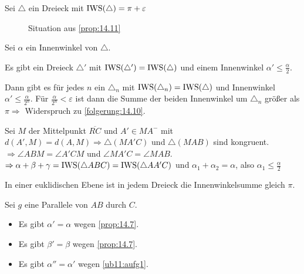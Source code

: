 \begin{beweis}
    Sei $\triangle$ ein Dreieck mit $\operatorname{IWS}(\triangle) = \pi + \varepsilon$

    \begin{figure}[ht]
        \centering
        \label{fig:prop14.11.0}
        \caption{Situation aus \cref{prop:14.11}}
    \end{figure}

    Sei $\alpha$ ein Innenwinkel von $\triangle$.

    \begin{behauptung}
        Es gibt ein Dreieck $\triangle'$ mit 
        $\operatorname{IWS}(\triangle') = \operatorname{IWS}(\triangle)$ und einem Innenwinkel
        $\alpha' \leq \frac{\alpha}{2}$.

        Dann gibt es für jedes $n$ ein $\triangle_n$ mit $\operatorname{IWS}(\triangle_n) = \operatorname{IWS}(\triangle)$
        und Innenwinkel $\alpha' \leq \frac{\alpha}{2^n}$. Für $\frac{\alpha}{2^n} < \varepsilon$
        ist dann die Summe der beiden Innenwinkel
        um $\triangle_n$ größer als $\pi \Rightarrow$ Widerspruch zu
        \cref{folgerung:14.10}.
    \end{behauptung}

    \begin{beweis}
        Sei $M$ der Mittelpunkt $\overline{RC}$ und $A' \in MA^-$ mit
        $d(A', M) = d(A, M) \Rightarrow \triangle(MA'C)$ und
        $\triangle(MAB)$ sind kongruent.
        $\Rightarrow \angle ABM = \angle A'CM$ und $\angle MA'C = \angle MAB$.
        $\Rightarrow \alpha + \beta + \gamma =\operatorname{IWS}(\triangle ABC) = \operatorname{IWS}(\triangle AA'C)$
        und $\alpha_1 + \alpha_2 = \alpha$, also \obda $\alpha_1 \leq \frac{\alpha}{2}$
    \end{beweis}
\end{beweis}
\begin{bemerkung}%
    In einer euklidischen Ebene ist in jedem Dreieck die Innenwinkelsumme
    gleich $\pi$.
\end{bemerkung}
\begin{beweis}
    Sei $g$ eine Parallele von $AB$ durch $C$. 

    \begin{itemize}
        \item Es gibt $\alpha' = \alpha$ wegen \cref{prop:14.7}.
        \item Es gibt $\beta' = \beta$ wegen \cref{prop:14.7}.
        \item Es gibt $\alpha'' = \alpha'$ wegen \cref{ub11:aufg1}.
    \end{itemize}
\end{beweis}


